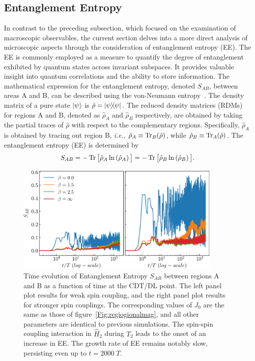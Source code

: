 \documentclass[12pt]{iopart}
\begin{document}
	\subsection{\label{sec:level41} Entanglement Entropy}
In contrast to the preceding subsection, which focused on the examination of macroscopic observables, the current section delves into a more direct analysis of microscopic aspects through the consideration of entanglement entropy (EE). The EE is commonly employed as a measure to quantify the degree of entanglement exhibited by quantum states across invariant subspaces. It provides valuable insight into quantum correlations and the ability to store information. The mathematical expression for the entanglement entropy, denoted $S_{AB}$, between areas A and B, can be described using the von-Neumann entropy~\cite{bayat_entanglement_2022,mendes-santos_measuring_2020}.   The density matrix of a pure state $\ket{\psi}$ is $\hat{\rho}= \ketbra{\psi}$. The reduced density matrices (RDMs) for regions A and B, denoted as $\hat{\rho}_A$ and $\hat{\rho}_B$ respectively, are obtained by taking the partial traces of $\hat{\rho}$ with respect to the complementary regions. Specifically, $\hat{\rho}_A$ is obtained by tracing out region B, \textit{i.e.}, $\hat{\rho}_A\equiv \mathop{\mathrm{Tr}}\nolimits_B(\hat{\rho})$, while $\hat{\rho}_B\equiv\mathop{\mathrm{Tr}}\nolimits_A(\hat{\rho})$. The entanglement entropy (EE) is determined by
\begin{equation} 
    S_{AB} = -\mathop{\mathrm{Tr}}\nolimits\big[\hat{\rho}_A \ln\left(\hat{\rho}_A\right)\big] = -\mathop{\mathrm{Tr}}\nolimits\big[\hat{\rho}_B \ln\left(\hat{\rho}_B\right)\big].
    \label{eq:vonentrop}
\end{equation}	
\begin{figure}[t!]
    \begin{center}
        \includegraphics[width=10cm]{figure11.pdf}
    \end{center}
    \caption{Time evolution of Entanglement Entropy $S_{AB}$ between regions A and B as a function of time at the CDT/DL point. The left panel plot results for weak spin coupling, and the right panel plot results for stronger spin couplings. The corresponding values of $J_0$ are the same as those of figure~\ref{Fig:regiogionalmag}, and all other parameters are identical to previous simulations. The spin-spin coupling interaction in $\hat{H}_2$ during $T_2$ leads to the onset of an increase in EE. The growth rate of EE remains notably slow, persisting even up to $t=2000\;T$.}
    \label{Fig:entangle}
\end{figure}
\end{document}
